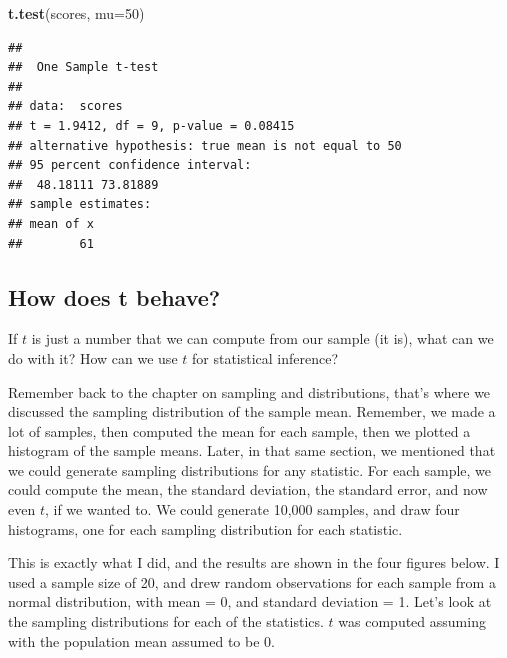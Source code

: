 \documentclass[
]{book}
\newenvironment{Shaded}{\begin{snugshade}}{\end{snugshade}}
\newcommand{\AttributeTok}[1]{\textcolor[rgb]{0.13,0.29,0.53}{#1}}
\newcommand{\DecValTok}[1]{\textcolor[rgb]{0.00,0.00,0.81}{#1}}
\newcommand{\FunctionTok}[1]{\textcolor[rgb]{0.13,0.29,0.53}{\textbf{#1}}}
\newcommand{\NormalTok}[1]{#1}
\begin{document}
\begin{Shaded}
\begin{Highlighting}[]
\FunctionTok{t.test}\NormalTok{(scores, }\AttributeTok{mu=}\DecValTok{50}\NormalTok{)}
\end{Highlighting}
\end{Shaded}

\begin{verbatim}
## 
##  One Sample t-test
## 
## data:  scores
## t = 1.9412, df = 9, p-value = 0.08415
## alternative hypothesis: true mean is not equal to 50
## 95 percent confidence interval:
##  48.18111 73.81889
## sample estimates:
## mean of x 
##        61
\end{verbatim}

\subsection{How does t behave?}\label{how-does-t-behave}

If \(t\) is just a number that we can compute from our sample (it is), what can we do with it? How can we use \(t\) for statistical inference?

Remember back to the chapter on sampling and distributions, that's where we discussed the sampling distribution of the sample mean. Remember, we made a lot of samples, then computed the mean for each sample, then we plotted a histogram of the sample means. Later, in that same section, we mentioned that we could generate sampling distributions for any statistic. For each sample, we could compute the mean, the standard deviation, the standard error, and now even \(t\), if we wanted to. We could generate 10,000 samples, and draw four histograms, one for each sampling distribution for each statistic.

This is exactly what I did, and the results are shown in the four figures below. I used a sample size of 20, and drew random observations for each sample from a normal distribution, with mean = 0, and standard deviation = 1. Let's look at the sampling distributions for each of the statistics. \(t\) was computed assuming with the population mean assumed to be 0.
\end{document}
